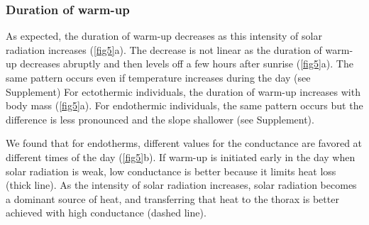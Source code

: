 \subsubsection*{Duration of warm-up}
As expected, the duration of warm-up decreases as this intensity of solar radiation increases (\cref{fig5}a).
The decrease is not linear as the duration of  warm-up decreases abruptly and then levels off a few hours after sunrise (\cref{fig5}a).
The same pattern occurs even if temperature increases during the day (see Supplement)
For ectothermic individuals, the duration of warm-up increases with body mass (\cref{fig5}a).
For endothermic individuals, the same pattern occurs but the difference is less pronounced and the slope shallower (see Supplement).

We found that for endotherms, different values for the conductance are favored at different times of the day (\cref{fig5}b).
If warm-up is initiated early in the day when solar radiation is weak, low conductance is better because it limits heat loss (thick line).
As the intensity of solar radiation increases, solar radiation becomes a dominant source of heat, and transferring that heat to the thorax is better achieved with high conductance (dashed line).

